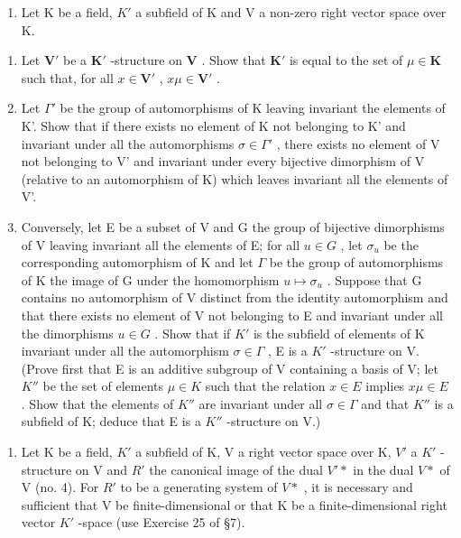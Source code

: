 \BourbakiExercisesSection

\begin{enumerate}
\def\labelenumi{\arabic{enumi}.}
\tightlist
\item
  Let K be a field, \(K'\) a subfield of K and V a non-zero right vector space over K.
\end{enumerate}

\begin{enumerate}
\def\labelenumi{(\alph{enumi})}
\item
  Let \(\mathbf{V}'\) be a \(\mathbf{K}'\) -structure on \(\mathbf{V}\) . Show that \(\mathbf{K}'\) is equal to the set of \(\mu \in \mathbf{K}\) such that, for all \(x \in \mathbf{V}'\) , \(x\mu \in \mathbf{V}'\) .
\item
  Let \(\Gamma'\) be the group of automorphisms of K leaving invariant the elements of K'. Show that if there exists no element of K not belonging to K' and invariant under all the automorphisms \(\sigma \in \Gamma'\) , there exists no element of V not belonging to V' and invariant under every bijective dimorphism of V (relative to an automorphism of K) which leaves invariant all the elements of V'.
\item
  Conversely, let E be a subset of V and G the group of bijective dimorphisms of V leaving invariant all the elements of E; for all \(u \in G\) , let \(\sigma_{u}\) be the corresponding automorphism of K and let \(\Gamma\) be the group of automorphisms of K the image of G under the homomorphism \(u \mapsto \sigma_{u}\) . Suppose that G contains no automorphism of V distinct from the identity automorphism and that there exists no element of V not belonging to E and invariant under all the dimorphisms \(u \in G\) . Show that if \(K'\) is the subfield of elements of K invariant under all the automorphism \(\sigma \in \Gamma\) , E is a \(K'\) -structure on V. (Prove first that E is an additive subgroup of V containing a basis of V; let \(K''\) be the set of elements \(\mu \in K\) such that the relation \(x \in E\) implies \(x\mu \in E\) . Show that the elements of \(K''\) are invariant under all \(\sigma \in \Gamma\) and that \(K''\) is a subfield of K; deduce that E is a \(K''\) -structure on V.)
\end{enumerate}

\begin{enumerate}
\def\labelenumi{\arabic{enumi}.}
\setcounter{enumi}{1}
\tightlist
\item
  Let K be a field, \(K'\) a subfield of K, V a right vector space over K, \(V'\) a \(K'\) -structure on V and \(R'\) the canonical image of the dual \(V'*\) in the dual \(V*\) of V (no. 4). For \(R'\) to be a generating system of \(V*\) , it is necessary and sufficient that V be finite-dimensional or that K be a finite-dimensional right vector \(K'\) -space (use Exercise 25 of §7).
\end{enumerate}

